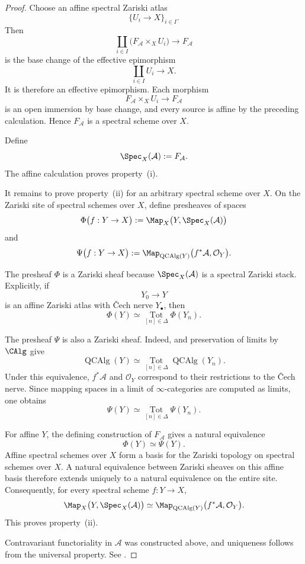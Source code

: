 \begin{proof}
Choose an affine spectral Zariski atlas
\[
    \{U_i\to X\}_{i\in I}.
\]
Then
\[
    \coprod_{i\in I}
    \bigl(
        F_{\mathcal A}
        \times_X
        U_i
    \bigr)
    \longrightarrow
    F_{\mathcal A}
\]
is the base change of the effective epimorphism
\[
    \coprod_{i\in I}U_i
    \longrightarrow
    X.
\]
It is therefore an effective epimorphism. Each morphism
\[
    F_{\mathcal A}
    \times_X
    U_i
    \longrightarrow
    F_{\mathcal A}
\]
is an open immersion by base change, and every source is affine by the
preceding calculation. Hence $F_{\mathcal A}$ is a spectral scheme over
$X$.

Define
\[
    \Spec_X(\mathcal A)
    :=
    F_{\mathcal A}.
\]
The affine calculation proves property~\textup{(i)}.

It remains to prove property~\textup{(ii)} for an arbitrary spectral
scheme over $X$. On the Zariski site of spectral schemes over $X$, define
presheaves of spaces
\[
    \Phi
    \bigl(
        f:Y\to X
    \bigr)
    :=
    \Map_X
    \bigl(
        Y,
        \Spec_X(\mathcal A)
    \bigr)
\]
and
\[
    \Psi
    \bigl(
        f:Y\to X
    \bigr)
    :=
    \Map_{\operatorname{QCAlg}(Y)}
    \bigl(
        f^*\mathcal A,
        \mathcal O_Y
    \bigr).
\]

The presheaf $\Phi$ is a Zariski sheaf because
$\Spec_X(\mathcal A)$ is a spectral Zariski stack. Explicitly, if
\[
    Y_0
    \longrightarrow
    Y
\]
is an affine Zariski atlas with \v{C}ech nerve $Y_\bullet$, then
\[
    \Phi(Y)
    \simeq
    \operatorname*{Tot}_{[n]\in\Delta}
    \Phi(Y_n).
\]

The presheaf $\Psi$ is also a Zariski sheaf. Indeed,
and preservation of limits by $\CAlg$ give
\[
    \operatorname{QCAlg}(Y)
    \simeq
    \operatorname*{Tot}_{[n]\in\Delta}
    \operatorname{QCAlg}(Y_n).
\]
Under this equivalence, $f^*\mathcal A$ and $\mathcal O_Y$ correspond to
their restrictions to the \v{C}ech nerve. Since mapping spaces in a limit
of $\infty$-categories are computed as limits, one obtains
\[
    \Psi(Y)
    \simeq
    \operatorname*{Tot}_{[n]\in\Delta}
    \Psi(Y_n).
\]

For affine $Y$, the defining construction of $F_{\mathcal A}$ gives a
natural equivalence
\[
    \Phi(Y)
    \simeq
    \Psi(Y).
\]
Affine spectral schemes over $X$ form a basis for the Zariski topology
on spectral schemes over $X$. A natural equivalence between Zariski
sheaves on this affine basis therefore extends uniquely to a natural
equivalence on the entire site. Consequently, for every spectral scheme
$f:Y\to X$,
\[
    \Map_X
    \bigl(
        Y,
        \Spec_X(\mathcal A)
    \bigr)
    \simeq
    \Map_{\operatorname{QCAlg}(Y)}
    \bigl(
        f^*\mathcal A,
        \mathcal O_Y
    \bigr).
\]
This proves property~\textup{(ii)}.

Contravariant functoriality in $\mathcal A$ was constructed above, and
uniqueness follows from the universal property. See
\cite{LurieSAG,KhanBraveNewMotivicI}.
\end{proof}

